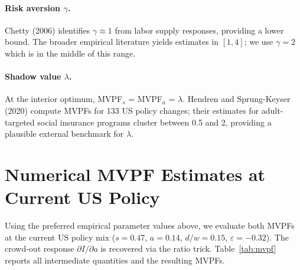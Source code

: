 \documentclass[12pt]{article}
\begin{document}
\paragraph{Risk aversion $\gamma$.}
Chetty (2006) identifies $\gamma \approx 1$ from labor supply responses, providing a lower bound.
The broader empirical literature yields estimates in $[1, 4]$; we use $\gamma = 2$ which is in the middle of this range.

\paragraph{Shadow value $\lambda$.}
At the interior optimum, MVPF$_s$ = MVPF$_a$ = $\lambda$.
Hendren and Sprung-Keyser (2020) compute MVPFs for 133 US policy changes; their estimates for adult-targeted social insurance programs cluster between 0.5 and 2, providing a plausible external benchmark for $\lambda$.

\section*{Numerical MVPF Estimates at Current US Policy}

Using the preferred empirical parameter values above, we evaluate both MVPFs at the current US policy mix ($s = 0.47$, $a = 0.14$, $d/w = 0.15$, $\varepsilon = -0.32$).
The crowd-out response $\partial I/\partial a$ is recovered via the ratio trick.
Table~\ref{tab:mvpf} reports all intermediate quantities and the resulting MVPFs.
\end{document}
